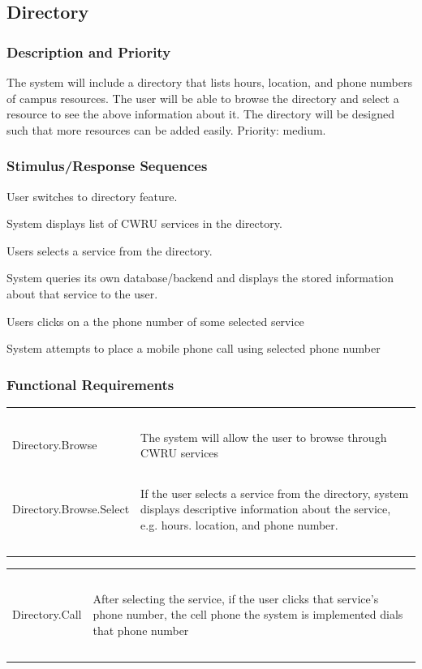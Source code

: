\documentclass[pdftex,12pt,letter]{article}
\begin{document}
\subsection{Directory}
\subsubsection{Description and Priority}
The system will include a directory that lists hours, location, and phone numbers of campus resources. The user will be able to browse the directory and select a resource to see the above information about it. The directory will be designed such that more resources can be added easily. Priority: medium.
\subsubsection{Stimulus/Response Sequences}
\begin{description}\itemsep1pt
\item[Stimulus:] User switches to directory feature.
\item[Response:] System displays list of CWRU services in the directory.
\item[Stimulus:] Users selects a service from the directory.
\item[Response:] System queries its own database/backend and displays the stored information about that service to the user.
\item[Stimulus:] Users clicks on a the phone number of some selected service
\item[Response:] System attempts to place a mobile phone call using selected phone number
\end{description}
\subsubsection{Functional Requirements}
\begin{table}[!h]
\begin{tabularx}{\textwidth }[t]{|l Y|}
\hline
~&~\\
Directory.Browse & The system will allow the user to browse through CWRU services\\ 
~&~\\
Directory.Browse.Select & If the user selects a service from the directory, system displays descriptive information about the service, e.g. hours. location, and phone number.\\
~&~\\
\hline
\end{tabularx}
\end{table}
\begin{table}[!h]
\begin{tabularx}{\textwidth }[t]{|l Y|}
\hline
~&~\\
Directory.Call & After selecting the service, if the user clicks that service's phone number, the cell phone the system is implemented dials that phone number\\
~&~\\
\hline
\end{tabularx}
\end{table}
\FloatBarrier
\end{document}
